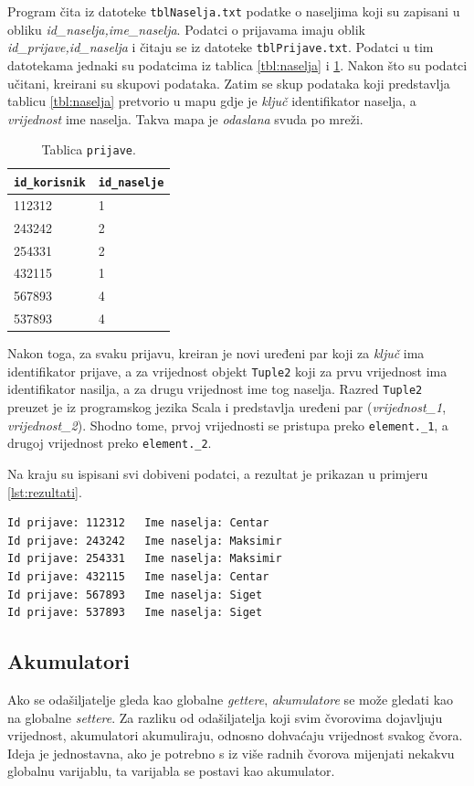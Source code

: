 \documentclass[times, utf8, zavrsni, numeric]{fer}
\begin{document}
Program čita iz datoteke \texttt{tblNaselja.txt} podatke o naseljima koji su zapisani u obliku \emph{id\_naselja,ime\_naselja}. Podatci o prijavama imaju oblik \emph{id\_prijave,id\_naselja} i čitaju se iz datoteke \texttt{tblPrijave.txt}. Podatci u tim datotekama jednaki su podatcima iz tablica \ref{tbl:naselja} i \ref{tbl:prijave}. Nakon što su podatci učitani, kreirani su skupovi podataka. Zatim se skup podataka koji predstavlja tablicu \ref{tbl:naselja} pretvorio u mapu gdje je \emph{ključ} identifikator naselja, a \emph{vrijednost} ime naselja. Takva mapa je \emph{odaslana} svuda po mreži. 

\begin{table}[htb]
\caption{Tablica \texttt{prijave}.}
\label{tbl:prijave}
\centering
\begin{tabular}{ll} 
\hline
\texttt{id\_korisnik} & \texttt{id\_naselje}\\
\hline
112312 & 1\\
243242 & 2\\
254331 & 2\\
432115 & 1\\
567893 & 4\\
537893 & 4\\
\hline
\end{tabular}
\end{table}

Nakon toga, za svaku prijavu, kreiran je novi uređeni par koji za \emph{ključ} ima identifikator prijave, a za vrijednost objekt \texttt{Tuple2} koji za prvu vrijednost ima identifikator nasilja, a za drugu vrijednost ime tog naselja. Razred \texttt{Tuple2} preuzet je iz programskog jezika Scala i predstavlja uređeni par (\emph{vrijednost\_1}, \emph{vrijednost\_2}). Shodno tome, prvoj vrijednosti se pristupa preko \texttt{element.\_1}, a drugoj vrijednost preko \texttt{element.\_2}.

Na kraju su ispisani svi dobiveni podatci, a rezultat je prikazan u primjeru \ref{lst:rezultati}.
\begin{lstlisting}[label={lst:rezultati}, caption={Identifikatori prijave i imena naselja odakle su prijave poslane.}]
Id prijave: 112312 	 Ime naselja: Centar
Id prijave: 243242 	 Ime naselja: Maksimir
Id prijave: 254331 	 Ime naselja: Maksimir
Id prijave: 432115 	 Ime naselja: Centar
Id prijave: 567893 	 Ime naselja: Siget
Id prijave: 537893 	 Ime naselja: Siget
\end{lstlisting}

\subsection{Akumulatori}
Ako se odašiljatelje gleda kao globalne \emph{gettere}, \emph{akumulatore}  se može gledati kao na globalne \emph{settere}. Za razliku od odašiljatelja koji svim čvorovima dojavljuju vrijednost, akumulatori akumuliraju, odnosno dohvaćaju vrijednost svakog čvora. Ideja je jednostavna, ako je potrebno s iz više radnih čvorova mijenjati nekakvu globalnu varijablu, ta varijabla se postavi kao akumulator.
\end{document}
